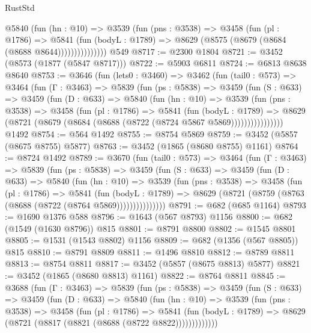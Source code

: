 \begin{lexlean}{RustStd}
\begin{coremodule}
                @5840
                  (fun (hn : @10) =>
                  @3539
                    (fun (pns : @3538) =>
                    @3458
                      (fun (pl : @1786) =>
                      @5841
                        (fun (bodyL : @1789) =>
                        @8629 (@8575 (@8679 (@8684 (@8688 @8644)))))))))))))))
    @549
@8717 := @2300 @1804
@8721 := @3452 (@8573 (@1877 (@5847 @8717)))
@8722 := @5903 @6811
@8724 := @6813 @8638 @8640
@8753 := @3646
    (fun (lets0 : @3460) =>
    @3462
      (fun (tail0 : @573) =>
      @3464
        (fun (Γ : @3463) =>
        @5839
          (fun (ps : @5838) =>
          @3459
            (fun (S : @633) =>
            @3459
              (fun (D : @633) =>
              @5840
                (fun (hn : @10) =>
                @3539
                  (fun (pns : @3538) =>
                  @3458
                    (fun (pl : @1786) =>
                    @5841
                      (fun (bodyL : @1789) =>
                      @8629 (@8721 (@8679 (@8684 (@8688 (@8722 (@8724 @5867 @5869))))))))))))))))
    @1492
@8754 := @564 @1492
@8755 := @8754 @5869
@8759 := @3452 (@5857 (@8675 @8755) @5877)
@8763 := @3452 (@1865 (@8680 @8755) @1161)
@8764 := @8724 @1492
@8789 := @3670
    (fun (tail0 : @573) =>
    @3464
      (fun (Γ : @3463) =>
      @5839
        (fun (ps : @5838) =>
        @3459
          (fun (S : @633) =>
          @3459
            (fun (D : @633) =>
            @5840
              (fun (hn : @10) =>
              @3539
                (fun (pns : @3538) =>
                @3458
                  (fun (pl : @1786) =>
                  @5841
                    (fun (bodyL : @1789) =>
                    @8629 (@8721 (@8759 (@8763 (@8688 (@8722 (@8764 @5869)))))))))))))))
@8791 := @682 (@685 @1164)
@8793 := @1690 @1376 @588
@8796 := @1643 (@567 @8793) @1156
@8800 := @682 (@1549 (@1630 @8796)) @815
@8801 := @8791 @8800
@8802 := @1545 @8801
@8805 := @1531 (@1543 @8802) @1156
@8809 := @682 (@1356 (@567 @8805)) @815
@8810 := @8791 @8809
@8811 := @1496 @8810
@8812 := @8789 @8811
@8813 := @8754 @8811
@8817 := @3452 (@5857 (@8675 @8813) @5877)
@8821 := @3452 (@1865 (@8680 @8813) @1161)
@8822 := @8764 @8811
@8845 := @3688
    (fun (Γ : @3463) =>
    @5839
      (fun (ps : @5838) =>
      @3459
        (fun (S : @633) =>
        @3459
          (fun (D : @633) =>
          @5840
            (fun (hn : @10) =>
            @3539
              (fun (pns : @3538) =>
              @3458
                (fun (pl : @1786) =>
                @5841
                  (fun (bodyL : @1789) =>
                  @8629 (@8721 (@8817 (@8821 (@8688 (@8722 @8822)))))))))))))

\end{coremodule}
\end{lexlean}
